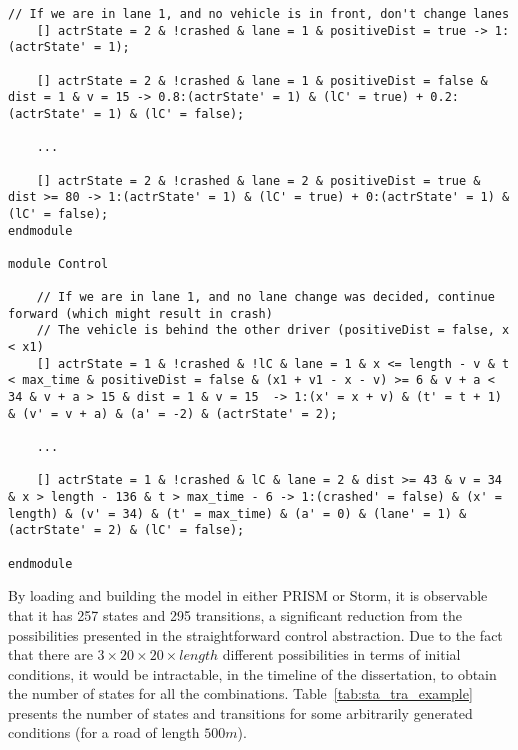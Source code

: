 {\begin{lstlisting}[caption={Example of the model generated for the tuple $(d_{type}, v, v_1, x_{1,0}) = (1,30,22,51)$ (shortened)},captionpos=b,label={lst:model_example}]
	// If we are in lane 1, and no vehicle is in front, don't change lanes
	[] actrState = 2 & !crashed & lane = 1 & positiveDist = true -> 1:(actrState' = 1);

	[] actrState = 2 & !crashed & lane = 1 & positiveDist = false & dist = 1 & v = 15 -> 0.8:(actrState' = 1) & (lC' = true) + 0.2:(actrState' = 1) & (lC' = false);

	...

	[] actrState = 2 & !crashed & lane = 2 & positiveDist = true & dist >= 80 -> 1:(actrState' = 1) & (lC' = true) + 0:(actrState' = 1) & (lC' = false);
endmodule

module Control

 	// If we are in lane 1, and no lane change was decided, continue forward (which might result in crash)
 	// The vehicle is behind the other driver (positiveDist = false, x < x1)
	[] actrState = 1 & !crashed & !lC & lane = 1 & x <= length - v & t < max_time & positiveDist = false & (x1 + v1 - x - v) >= 6 & v + a < 34 & v + a > 15 & dist = 1 & v = 15  -> 1:(x' = x + v) & (t' = t + 1) & (v' = v + a) & (a' = -2) & (actrState' = 2);

	...

	[] actrState = 1 & !crashed & lC & lane = 2 & dist >= 43 & v = 34 & x > length - 136 & t > max_time - 6 -> 1:(crashed' = false) & (x' = length) & (v' = 34) & (t' = max_time) & (a' = 0) & (lane' = 1) & (actrState' = 2) & (lC' = false);

endmodule
\end{lstlisting}
}

By loading and building the model in either PRISM or Storm, it is observable that it has 257 states and 295 transitions, a significant reduction from the possibilities presented in the straightforward control abstraction. Due to the fact that there are $3\times 20 \times 20 \times length$ different possibilities in terms of initial conditions, it would be intractable, in the timeline of the dissertation, to obtain the number of states for all the combinations. Table~\ref{tab:sta_tra_example} presents the number of states and transitions for some arbitrarily generated conditions (for a road of length $500m$).

